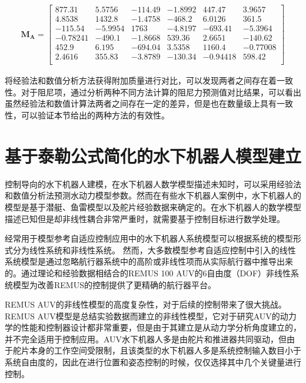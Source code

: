 \begin{equation}
\begin{aligned}
\bm{M_{A}} = \begin{bmatrix}
     877.31 &   5.5756 &  -114.49 &  -1.8992 &   447.47 &   3.9657\\
     4.8538 &   1432.8 &  -1.4758 &  -468.2  &   6.0126 &    361.5\\
     -115.54 &  -5.9954  &  1763  &  -4.8197 &  -693.41 &  -5.3964\\
     -0.78241 &  -490.1  &  -1.8668  &  539.36 & 2.6651  &  -140.62\\
     452.9  &  6.195 &  -694.04  &  3.5358 &   1160.4  & -0.77008\\
     2.4616  &  355.83 &  -3.8789 &  -130.34 &  -0.94418  &  598.42\\
         \end{bmatrix}
\end{aligned}
\end{equation}


将经验法和数值分析方法获得附加质量进行对比，可以发现两者之间存在着一致性。对于阻尼项，通过分析两种不同方法计算的阻尼力预测值对比结果，可以看出虽然经验法和数值计算法两者之间存在一定的差异，但是也在数量级上具有一致性，可以验证本节给出的两种方法的有效性。


\section{基于泰勒公式简化的水下机器人模型建立  }

控制导向的水下机器人建模，在水下机器人数学模型描述未知时，可以采用经验法和数值分析法预测水动力模型参数。然而在有些水下机器人案例中，水下机器人的模型是基于潜艇、鱼雷模型以及舵片经验数据来确定的\cite{yuanchuan2001submarine,Borst1985Fluid,bottaccini1954stablity}。在水下机器人的数学模型描述已知但是却非线性耦合非常严重时，就需要基于控制目标进行数学处理。

经常用于模型参考自适应控制应用中的水下机器人系统模型可以根据系统的模型形式分为线性系统和非线性系统。 然而，大多数模型参考自适应控制中引入的线性系统模型是通过忽略航行器系统中的高阶或非线性项而从实际航行器中推导出来的。通过理论和经验数据相结合的REMUS 100 AUV的6自由度（DOF）非线性系统模型为改善REMUS的控制提供了更精确的航行器平台。

REMUS AUV的非线性模型的高度复杂性，对于后续的控制带来了很大挑战。 REMUS AUV模型是总结实验数据而建立的非线性模型，它对于研究AUV的动力学的性能和控制器设计都非常重要，但是由于其建立是从动力学分析角度建立的，并不完全适用于控制应用。AUV水下机器人多是由舵片和推进器共同驱动，但由于舵片本身的工作空间受限制，且该类型的水下机器人多是系统控制输入数目小于系统自由度的，因此在进行位置和姿态控制的时候，仅仅选择其中几个关键量进行控制。

